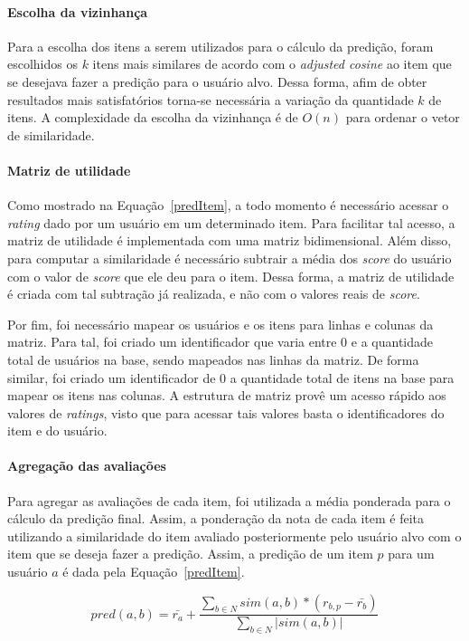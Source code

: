 \documentclass[brazil,a4paper,11pt]{article}
\begin{document}
\paragraph{Escolha da vizinhança} Para a escolha dos itens a serem utilizados para o cálculo da predição, foram escolhidos os $k$ itens mais similares de acordo com o \textit{adjusted cosine} ao item que se desejava fazer a predição para o usuário alvo. Dessa forma, afim de obter resultados mais satisfatórios torna-se necessária a variação da quantidade $k$ de itens. A complexidade da escolha da vizinhança é de $O(n)$ para ordenar o vetor de similaridade.

\paragraph{Matriz de utilidade} Como mostrado na Equação~\ref{predItem}, a todo momento é necessário acessar o \textit{rating} dado por um usuário em um determinado item. Para facilitar tal acesso, a matriz de utilidade é implementada com uma matriz bidimensional. Além disso, para computar a similaridade é necessário subtrair a média dos \textit{score} do usuário com o valor de \textit{score} que ele deu para o item. Dessa forma, a matriz de utilidade é criada com tal subtração já realizada, e não com o valores reais de \textit{score}. 

Por fim, foi necessário mapear os usuários e os itens para linhas e colunas da matriz. Para tal, foi criado um identificador que varia entre 0 e a quantidade total de usuários na base, sendo mapeados nas linhas da matriz. De forma similar, foi criado um identificador de 0 a quantidade total de itens na base para mapear os itens nas colunas. A estrutura de matriz provê um acesso rápido aos valores de \textit{ratings}, visto que para acessar tais valores basta o identificadores do item e do usuário.

\paragraph{Agregação das avaliações}  Para agregar as avaliações de cada item, foi utilizada a média ponderada para o cálculo da predição final. Assim, a ponderação da nota de cada item é feita utilizando a similaridade do item avaliado posteriormente pelo usuário alvo com o item que se deseja fazer a predição. Assim, a predição de um item $p$ para um usuário $a$ é dada pela Equação~\ref{predItem}.

\begin{equation}
\label{predItem}
pred(a,b) = \bar{r_a} + \frac{\sum_{b\in N} sim(a,b) * (r_{b,p} - \bar{r_b})}{\sum_{b \in N} |sim(a,b)|}
\end{equation}
\end{document}
